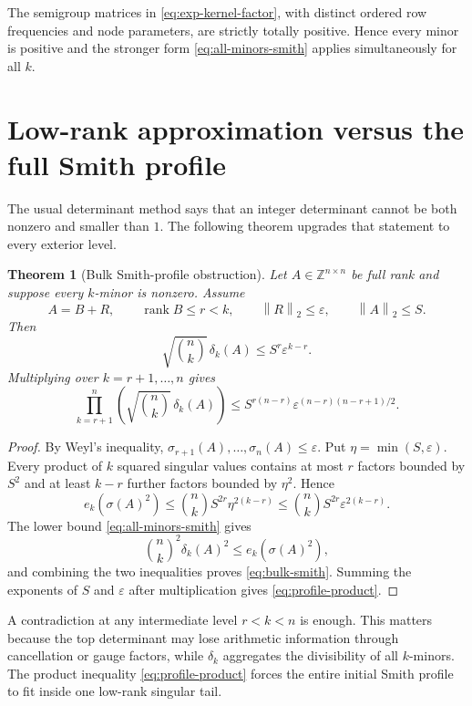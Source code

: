 \documentclass[11pt,oneside]{article}
\newtheorem{theorem}{Theorem}[section]
\theoremstyle{definition}
\theoremstyle{remark}
\newcommand{\Z}{\mathbb{Z}}
\newcommand{\rank}{\operatorname{rank}}
\newcommand{\norm}[1]{\left\lVert #1\right\rVert}
\newcommand{\eps}{\varepsilon}
\begin{document}
The semigroup matrices in \eqref{eq:exp-kernel-factor}, with distinct ordered row frequencies and node parameters, are strictly totally positive.  Hence every minor is positive and the stronger form \eqref{eq:all-minors-smith} applies simultaneously for all $k$.

\section{Low-rank approximation versus the full Smith profile}
\label{sec:lowrank}

The usual determinant method says that an integer determinant cannot be both nonzero and smaller than $1$.  The following theorem upgrades that statement to every exterior level.

\begin{theorem}[Bulk Smith-profile obstruction]
\label{thm:bulk-smith}
Let $A\in\Z^{n\times n}$ be full rank and suppose every $k$-minor is nonzero.  Assume
\[
 A=B+R,
 \qquad \rank B\le r<k,
 \qquad \norm{R}_2\le\eps,
 \qquad \norm{A}_2\le S.
\]
Then
\begin{equation}
 \boxed{
 \sqrt{\binom nk}\,\delta_k(A)
 \le S^r\eps^{k-r}.}
 \label{eq:bulk-smith}
\end{equation}
Multiplying over $k=r+1,\dots,n$ gives
\begin{equation}
 \prod_{k=r+1}^n\left(\sqrt{\binom nk}\,\delta_k(A)\right)
 \le S^{r(n-r)}
 \eps^{(n-r)(n-r+1)/2}.
 \label{eq:profile-product}
\end{equation}
\end{theorem}

\begin{proof}
By Weyl's inequality, $\sigma_{r+1}(A),\dots,\sigma_n(A)\le\eps$.  Put $\eta=\min(S,\eps)$.  Every product of $k$ squared singular values contains at most $r$ factors bounded by $S^2$ and at least $k-r$ further factors bounded by $\eta^2$.  Hence
\[
 e_k(\sigma(A)^2)\le\binom nk S^{2r}\eta^{2(k-r)}
 \le\binom nk S^{2r}\eps^{2(k-r)}.
\]
The lower bound \eqref{eq:all-minors-smith} gives
\[
 \binom nk^2\delta_k(A)^2
 \le e_k(\sigma(A)^2),
\]
and combining the two inequalities proves \eqref{eq:bulk-smith}.  Summing the exponents of $S$ and $\eps$ after multiplication gives \eqref{eq:profile-product}.
\end{proof}

\begin{resultbox}
A contradiction at any intermediate level $r<k<n$ is enough.  This matters because the top determinant may lose arithmetic information through cancellation or gauge factors, while $\delta_k$ aggregates the divisibility of all $k$-minors.  The product inequality \eqref{eq:profile-product} forces the entire initial Smith profile to fit inside one low-rank singular tail.
\end{resultbox}
\end{document}
